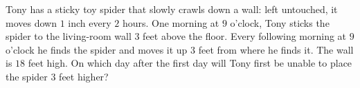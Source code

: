 Tony has a sticky toy spider that slowly crawls down a wall: left untouched, it moves down $1$ inch every $2$ hours. One morning at $9$ o'clock, Tony sticks the spider to the living-room wall $3$ feet above the floor. Every following morning at $9$ o'clock he finds the spider and moves it up $3$ feet from where he finds it. The wall is $18$ feet high. On which day after the first day will Tony first be unable to place the spider $3$ feet higher?
